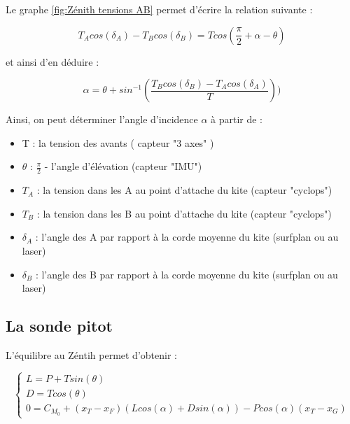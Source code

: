 \documentclass[conference]{IEEEtran}
\begin{document}
Le graphe \ref{fig:Zénith tensions AB} permet d'écrire la relation suivante : 
\begin{center}
    \begin{equation}
        T_A cos(\delta_A) - T_B cos(\delta_B) = T cos(\frac{\pi}{2} +\alpha - \theta)
    \end{equation}
\end{center}

et ainsi d'en déduire :

\begin{center}
    \begin{equation}
        \alpha = \theta + sin^{-1}(\frac{T_B cos(\delta_B) - T_A cos(\delta_A)}{T}))
        \label{eq:alpha}
    \end{equation}
\end{center}

Ainsi, on peut déterminer l'angle d'incidence $\alpha$ à partir de :
\begin{itemize}
    \item T : la tension des avants ( capteur "3 axes" )
    \item $\theta$ : $\frac{\pi}{2}$ - l'angle d'élévation (capteur "IMU")
    \item $T_A$ : la tension dans les A au point d'attache du kite (capteur "cyclops")
    \item $T_B$ : la tension dans les B au point d'attache du kite (capteur "cyclops")
    \item $\delta_A$ : l'angle des A par rapport à la corde moyenne du kite (surfplan ou au laser)
    \item $\delta_B$ : l'angle des B par rapport à la corde moyenne du kite (surfplan ou au laser)
\end{itemize}

\subsection{La sonde pitot}
L'équilibre au Zéntih permet d'obtenir : 

\begin{equation}
    \begin{cases}
        L = P + T sin(\theta) \\
        D = T cos(\theta) \\
        0 = C_{M_0} + (x_T - x_F) (L cos(\alpha) + D sin(\alpha)) - P cos(\alpha) (x_T - x_G)
    \end{cases}
    \label{eq:equilibre aero}
\end{equation}
\end{document}
